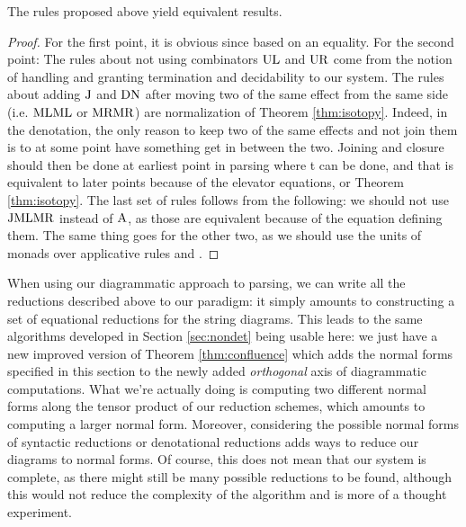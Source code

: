 \begin{theorem}
	The rules proposed above yield equivalent results.
\end{theorem}
\begin{proof}
	For the first point, it is obvious since based on an equality.
	For the second point:
	The rules about not using combinators $\text{UL}$ and $\text{UR}$ come from the
	notion of handling and granting termination and decidability to our system.
	The rules about adding $\text{J}$ and $\text{DN}$ after moving two of the same
	effect from the same side (i.e. $\text{ML} \text{ML}$ or $\text{MR}\text{MR}$) are
	normalization of Theorem \ref{thm:isotopy}.
	Indeed, in the denotation, the only reason to keep two of the same effects
	and not join them is to at some point	have something get in between the two.
	Joining and closure should then be done at earliest point in parsing where t
	can be done, and that is equivalent to later points because of the elevator
	equations, or Theorem \ref{thm:isotopy}.
	The last set of rules follows from the following: we should not use $\text{J}
		\text{ML} \text{MR}$ instead of $\text{A}$, as those are equivalent because of the
	equation defining them.
	The same thing goes for the other two, as we should use the units of monads
	over applicative rules and \fmap.
\end{proof}

When using our diagrammatic approach to parsing, we can write all the
reductions described above to our paradigm: it simply amounts to
constructing a set of equational reductions for the string diagrams.
This leads to the same algorithms developed in Section \ref{sec:nondet} being
usable here: we just have a new improved version of Theorem
\ref{thm:confluence} which adds the normal forms specified in this section to
the newly added \emph{orthogonal} axis of diagrammatic computations.
What we're actually doing is computing two different normal forms along the
tensor product of our reduction schemes, which amounts to computing a larger
normal form.
Moreover, considering the possible normal forms of syntactic reductions
or denotational reductions adds ways to reduce our diagrams to normal forms.
Of course, this does not mean that our system is complete, as there might still
be many possible reductions to be found, although this would not reduce the
complexity of the algorithm and is more of a thought experiment.


